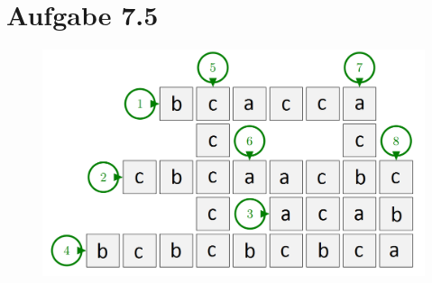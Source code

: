 \documentclass{article}
\begin{document}
\clearpage
\section*{Aufgabe 7.5}
\begin{figure}[!h]
  \includegraphics[scale=0.4]{crossword.png}
\end{figure}
\end{document}
